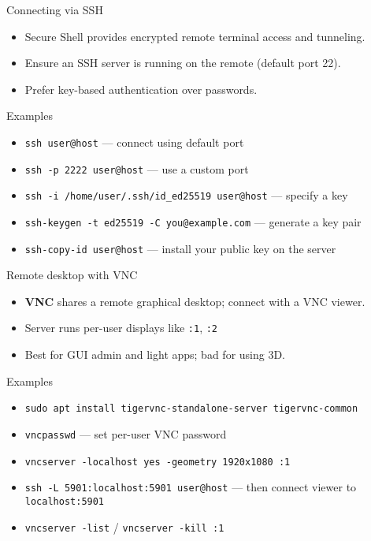 \documentclass{beamer}
\begin{document}
\begin{frame}{Connecting via SSH}
  \begin{itemize}
    \item Secure Shell provides encrypted remote terminal access and tunneling.
    \item Ensure an SSH server is running on the remote (default port 22).
    \item Prefer key-based authentication over passwords.
  \end{itemize}
  \begin{exampleblock}{Examples}
    \begin{itemize}
      \item \texttt{ssh user@host} — connect using default port
      \item \texttt{ssh -p 2222 user@host} — use a custom port
      \item \texttt{ssh -i /home/user/.ssh/id\_ed25519 user@host} — specify a key
      \item \texttt{ssh-keygen -t ed25519 -C you@example.com} — generate a key pair
      \item \texttt{ssh-copy-id user@host} — install your public key on the server
    \end{itemize}
  \end{exampleblock}
\end{frame}

\begin{frame}{Remote desktop with VNC}
  \begin{itemize}
    \item \textbf{VNC} shares a remote graphical desktop; connect with a VNC viewer.
    \item Server runs per-user displays like \texttt{:1}, \texttt{:2}
    \item Best for GUI admin and light apps; bad for using 3D.
  \end{itemize}
  \begin{exampleblock}{Examples}
    \begin{itemize}
      \item \texttt{sudo apt install tigervnc-standalone-server tigervnc-common}
      \item \texttt{vncpasswd} — set per-user VNC password
      \item \texttt{vncserver -localhost yes -geometry 1920x1080 :1} %
      \item \texttt{ssh -L 5901:localhost:5901 user@host} — then connect viewer to \texttt{localhost:5901}
      \item \texttt{vncserver -list} / \texttt{vncserver -kill :1} %
    \end{itemize}
  \end{exampleblock}
\end{frame}
\end{document}
